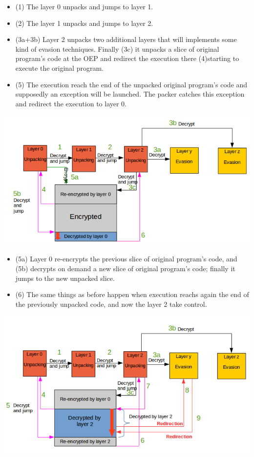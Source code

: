 \begin{itemize}
\item (1) The layer 0 unpacks and jumps to layer 1.
\item (2) The layer 1 unpacks and jumps to layer 2.
\item (3a+3b) Layer 2 unpacks two additional layers that will implements some kind of evasion techniques. Finally (3c) it unpacks a slice of original program's code at the OEP and redirect the execution there (4)starting to execute the original program.
\item (5) The execution reach the end of the unpacked original program's code and supposedly an exception will be launched. The packer catches this exception and redirect the execution to layer 0.
\end{itemize}


\includegraphics[width=1.05\textwidth]{pictures/packer_type_6-1.png}

\begin{itemize}
\item (5a) Layer 0 re-encrypts the previous slice of original program's code, and (5b) decrypts on demand a new slice of original program's code; finally it jumps to the new unpacked slice.
\item (6) The same things as before happen when execution reachs again the end of the previously unpacked code, and now the layer 2 take control.
\end{itemize}

\includegraphics[width=1.05\textwidth]{pictures/packer_type_6-2.png}

